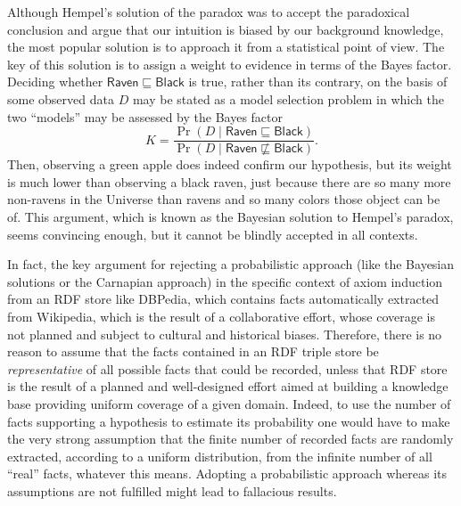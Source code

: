 \documentclass[a4paper]{article}
\newcounter{ex}
\begin{document}
Although Hempel's solution of the paradox was to accept the paradoxical conclusion
and argue that our intuition is biased by our background knowledge, the most popular
solution is to approach it from a statistical point of view. The key of this solution
is to assign a weight to evidence in terms of the Bayes factor. Deciding whether
$\mathsf{Raven} \sqsubseteq \mathsf{Black}$ is true, rather than its contrary, on the basis
of some observed data $D$ may be stated as a model selection problem in which the two
``models'' may be assessed by the Bayes factor
\begin{equation}
  K = \frac{\Pr(D \mid \mathsf{Raven} \sqsubseteq \mathsf{Black})}{\Pr(D \mid \mathsf{Raven} \not\sqsubseteq \mathsf{Black})}.
\end{equation}
Then, observing a green apple does indeed confirm our hypothesis, but its weight
is much lower than observing a black raven, just because there are so many more non-ravens in the
Universe than ravens and so many colors those object can be of. This argument, which
is known as the Bayesian solution to Hempel's paradox, seems convincing enough,
but it cannot be blindly accepted in all contexts.

In fact, the key argument for rejecting a probabilistic approach (like the Bayesian solutions
or the Carnapian approach) in the specific context of axiom induction from an RDF store
like DBPedia, which contains facts automatically extracted from Wikipedia,
which is the result of a collaborative effort, whose coverage is not planned and
subject to cultural and historical biases.
Therefore, there is no reason to assume that the facts contained in an RDF triple store
be \emph{representative} of all possible facts that could be recorded, unless
that RDF store is the result of a planned and well-designed effort aimed at building
a knowledge base providing uniform coverage of a given domain.
Indeed, to use the number of facts supporting a hypothesis
to estimate its probability one would have to make the very strong assumption
that the finite number of recorded facts are randomly extracted, according to a
uniform distribution, from the infinite number of all ``real'' facts, whatever
this means. Adopting a probabilistic approach whereas its assumptions are not
fulfilled might lead to fallacious results.
\end{document}
